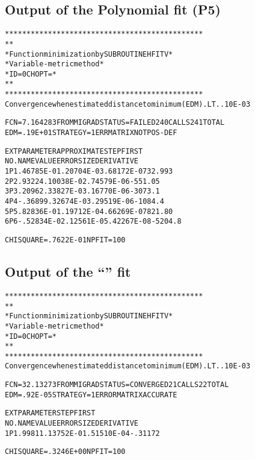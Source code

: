 \subsection*{Output of the Polynomial fit (P5)}
\begin{alltt}
     **********************************************
     *                                            *
     * Function minimization by SUBROUTINE HFITV  *
     * Variable-metric method                     *
     * ID =          0  CHOPT =                   *
     *                                            *
     **********************************************
 Convergence when estimated distance to minimum (EDM) .LT.   .10E-03

 FCN=   7.164283     FROM MIGRAD    STATUS=FAILED       240 CALLS      241 TOTAL
                     EDM=   .19E+01    STRATEGY= 1      ERR MATRIX NOT POS-DEF

  EXT PARAMETER                APPROXIMATE        STEP         FIRST
  NO.   NAME        VALUE          ERROR          SIZE      DERIVATIVE
   1      P1        .46785E-01    .20704E-03    .68172E-07    32.993
   2      P2        .93224        .10038E-02    .74579E-06   -551.05
   3      P3        .20962        .33827E-03    .16770E-06   -3073.1
   4      P4       -.36899        .32674E-03    .29519E-06   -1084.4
   5      P5        .82836E-01    .19712E-04    .66269E-07    821.80
   6      P6       -.52834E-02    .12561E-05    .42267E-08   -5204.8

 CHISQUARE =  .7622E-01  NPFIT =  100
\end{alltt}
\subsection*{Output of the ``\COMIS'' fit}
\begin{alltt}
     **********************************************
     *                                            *
     * Function minimization by SUBROUTINE HFITV  *
     * Variable-metric method                     *
     * ID =          0  CHOPT =                   *
     *                                            *
     **********************************************
 Convergence when estimated distance to minimum (EDM) .LT.   .10E-03

 FCN=   32.13273     FROM MIGRAD    STATUS=CONVERGED     21 CALLS       22 TOTAL
                     EDM=   .92E-05    STRATEGY= 1      ERROR MATRIX ACCURATE

  EXT PARAMETER                                   STEP         FIRST
  NO.   NAME        VALUE          ERROR          SIZE      DERIVATIVE
   1      P1        .99811        .13752E-01    .51510E-04   -.31172

 CHISQUARE =  .3246E+00  NPFIT =  100
\end{alltt}

